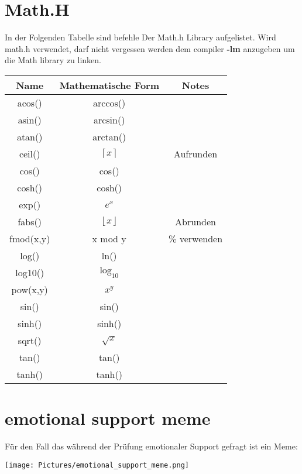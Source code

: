 \section{Math.H}

In der Folgenden Tabelle sind befehle Der Math.h Library aufgelistet. Wird math.h verwendet, darf nicht vergessen werden dem compiler \textbf{-lm} anzugeben um die Math library zu linken.\\

\begin{center}
    \begin{tabular}{ccc} 
         Name&  Mathematische Form& Notes\\ \hline
         acos()&  arccos()& \\ 
         asin()&  arcsin()& \\ 
         atan()&  arctan()& \\ 
         ceil()& $\left \lceil{x}\right \rceil$ & Aufrunden\\ 
         cos()& cos()& \\
         cosh()& cosh() & \\
         exp()& $e^x$ & \\
         fabs()& $\left \lfloor{x}\right \rfloor$ & Abrunden \\
         fmod(x,y) & x mod y& \% verwenden \\
         log() & ln()& \\
         log10() & $\text{log}_{10}$& \\
         pow(x,y) & $x^y$ & \\
         sin() & sin() & \\
         sinh() & sinh() & \\
         sqrt() & $\sqrt{x}$ & \\
         tan() & tan() & \\
         tanh() & tanh() & \\
    \end{tabular}
    
\end{center}

\nextcol	

\section{emotional support meme}

Für den Fall das während der Prüfung emotionaler Support gefragt ist ein Meme:
\begin{center}
\texttt{[image: Pictures/emotional\_support\_meme.png]}
    
\end{center}
